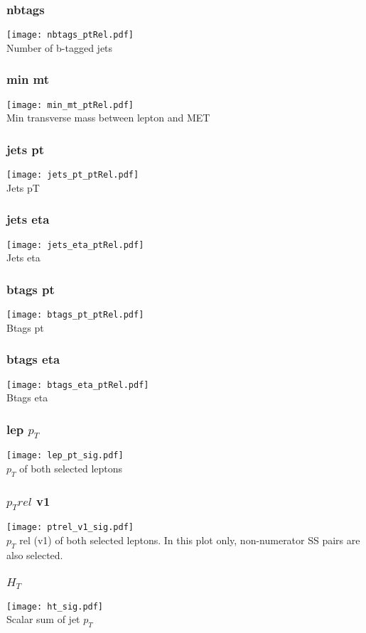 \documentclass{beamer}
\begin{document}
\begin{frame}
\frametitle{nbtags}
\texttt{[image: nbtags\_ptRel.pdf]} \\
Number of b-tagged jets
\end{frame}

\begin{frame}
\frametitle{min mt}
\texttt{[image: min\_mt\_ptRel.pdf]} \\
Min transverse mass between lepton and MET
\end{frame}

\begin{frame}
\frametitle{jets pt}
\texttt{[image: jets\_pt\_ptRel.pdf]} \\
Jets pT
\end{frame}

\begin{frame}
\frametitle{jets eta}
\texttt{[image: jets\_eta\_ptRel.pdf]} \\
Jets eta
\end{frame}

\begin{frame}
\frametitle{btags pt}
\texttt{[image: btags\_pt\_ptRel.pdf]} \\
Btags pt
\end{frame}

\begin{frame}
\frametitle{btags eta}
\texttt{[image: btags\_eta\_ptRel.pdf]} \\
Btags eta
\end{frame}

\begin{frame}
\frametitle{lep $p_T$}
\texttt{[image: lep\_pt\_sig.pdf]} \\
$p_T$ of both selected leptons
\end{frame}

\begin{frame}
\frametitle{$p_T rel$ v1}
\texttt{[image: ptrel\_v1\_sig.pdf]} \\
$p_T$ rel (v1) of both selected leptons.  In this plot only, non-numerator SS pairs are also selected.  
\end{frame}

\begin{frame}
\frametitle{$H_T$}
\texttt{[image: ht\_sig.pdf]} \\
Scalar sum of jet $p_T$
\end{frame}
\end{document}
